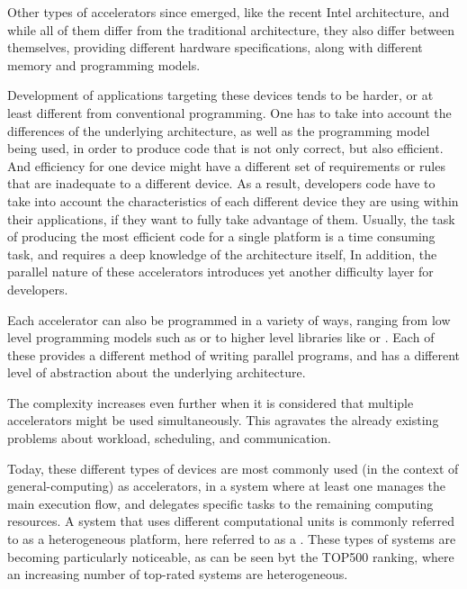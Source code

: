 \documentclass[main.tex]{subfiles}
\begin{document}
Other types of accelerators since emerged, like the recent Intel \mic architecture, and while all of them differ from the traditional \cpu architecture, they also differ between themselves, providing different hardware specifications, along with different memory and programming models. 

Development of applications targeting these devices tends to be harder, or at least different from conventional programming. One has to take into account the differences of the underlying architecture, as well as the programming model being used, in order to produce code that is not only correct, but also efficient. And efficiency for one device might have a different set of requirements or rules that are inadequate to a different device. As a result, developers code have to take into account the characteristics of each different device they are using within their applications, if they want to fully take advantage of them. Usually, the task of producing the most efficient code for a single platform is a time consuming task, and requires a deep knowledge of the architecture itself, In addition, the parallel nature of these accelerators introduces yet another difficulty layer for developers.

Each accelerator can also be programmed in a variety of ways, ranging from low level programming models such as \cuda or \opencl to higher level libraries like \openmp or \openacc. Each of these provides a different method of writing parallel programs, and has a different level of abstraction about the underlying architecture.

The complexity increases even further when it is considered that multiple accelerators might be used simultaneously. This agravates the already existing problems about workload, scheduling, and communication.


Today, these different types of devices are most commonly used (in the context of general-computing) as accelerators, in a system where at least one \cpu manages the main execution flow, and delegates specific tasks to the remaining computing resources. A system that uses different computational units is commonly referred to as a heterogeneous platform, here referred to as a \hetplat. These types of systems are becoming particularly noticeable, as can be seen byt the TOP500 ranking, where an increasing number of top-rated systems are heterogeneous.
\end{document}
